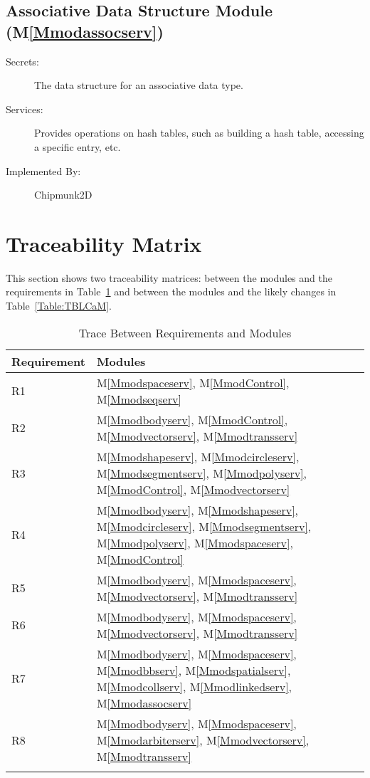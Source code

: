 \documentclass[12pt]{article}
\begin{document}
\subsection{Associative Data Structure Module (M\ref{Mmodassocserv})}
\label{Sec:ADSM()}
\begin{description}
\item[Secrets:]The data structure for an associative data type.
\item[Services:]Provides operations on hash tables, such as building a hash table, accessing a specific entry, etc.
\item[Implemented By:]Chipmunk2D
\end{description}
\section{Traceability Matrix}
\label{Sec:TracMatr}
This section shows two traceability matrices: between the modules and the requirements in Table~\ref{Table:TBRaM} and between the modules and the likely changes in Table~\ref{Table:TBLCaM}.
\begin{longtable}{l l}
\toprule
Requirement & Modules
\\
\midrule
R1 & M\ref{Mmodspaceserv}, M\ref{MmodControl}, M\ref{Mmodseqserv}
\\
R2 & M\ref{Mmodbodyserv}, M\ref{MmodControl}, M\ref{Mmodvectorserv}, M\ref{Mmodtransserv}
\\
R3 & M\ref{Mmodshapeserv}, M\ref{Mmodcircleserv}, M\ref{Mmodsegmentserv}, M\ref{Mmodpolyserv}, M\ref{MmodControl}, M\ref{Mmodvectorserv}
\\
R4 & M\ref{Mmodbodyserv}, M\ref{Mmodshapeserv}, M\ref{Mmodcircleserv}, M\ref{Mmodsegmentserv}, M\ref{Mmodpolyserv}, M\ref{Mmodspaceserv}, M\ref{MmodControl}
\\
R5 & M\ref{Mmodbodyserv}, M\ref{Mmodspaceserv}, M\ref{Mmodvectorserv}, M\ref{Mmodtransserv}
\\
R6 & M\ref{Mmodbodyserv}, M\ref{Mmodspaceserv}, M\ref{Mmodvectorserv}, M\ref{Mmodtransserv}
\\
R7 & M\ref{Mmodbodyserv}, M\ref{Mmodspaceserv}, M\ref{Mmodbbserv}, M\ref{Mmodspatialserv}, M\ref{Mmodcollserv}, M\ref{Mmodlinkedserv}, M\ref{Mmodassocserv}
\\
R8 & M\ref{Mmodbodyserv}, M\ref{Mmodspaceserv}, M\ref{Mmodarbiterserv}, M\ref{Mmodvectorserv}, M\ref{Mmodtransserv}
\\
\bottomrule
\caption{Trace Between Requirements and Modules}
\label{Table:TBRaM}
\end{longtable}
\end{document}
